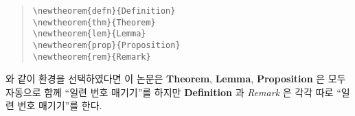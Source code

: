 \documentclass[a4paper,10pt]{amsproc}
\newlength\hunindentlen
\def\gethunindentlen#1{%
 \sbox{\mybox}{\textbf{#1.}}%
 \setlength\hunindentlen{\wd\mybox}%
 \addtolength\hunindentlen{5mm}%
}
\begin{document}
\begin{quote}
\noindent\gethunindentlen{예 2}
\hspace*{-\hunindentlen}\usebox{\mybox}\hspace{4mm}\verb|\newtheorem{defn}{Definition}| \\
   \verb|\newtheorem{thm}{Theorem}| \\
   \verb|\newtheorem{lem}{Lemma}| \\
   \verb|\newtheorem{prop}{Proposition}| \\
   \verb|\newtheorem{rem}{Remark}|
\end{quote}
와 같이 환경을 선택하였다면 이 논문은 \textbf{Theorem},
\textbf{Lemma}, \textbf{Proposition} 은 모두 자동으로 함께 ``일련 번호
매기기''를 하지만 \textbf{Definition} 과 \textit{Remark} 은 각각 따로
``일련 번호 매기기''를 한다.
\end{document}
